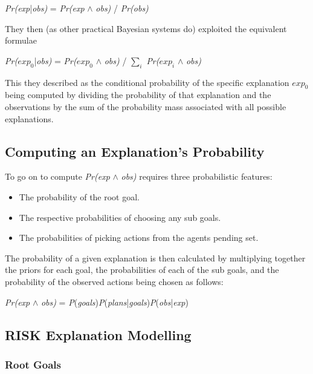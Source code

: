\documentclass[parskip]{cs4rep}
\begin{document}
\centerline{
\textit{Pr(exp}|\textit{obs)} = \textit{Pr(exp} $\wedge$ \textit{obs)} / \textit{Pr(obs)}
}

They then (as other practical Bayesian systems do) exploited the equivalent formulae\newline

\centerline{
\textit{Pr($exp_0$}|\textit{obs)} = \textit{Pr($exp_0$} $\wedge$ \textit{obs)} / $\displaystyle\sum\nolimits_{i}$ \textit{Pr($exp_i$} $\wedge$ \textit{obs)}
}

This they described as the conditional probability of the specific explanation $exp_0$ being computed by dividing the probability of that explanation and the observations by the sum of the probability mass associated with all possible explanations.

\subsection{Computing an Explanation's Probability}

To go on to compute \textit{Pr(exp} $\wedge$ \textit{obs)} requires three probabilistic features:\newline

\begin{itemize}
\item
The probability of the root goal.
\item
The respective probabilities of choosing any sub goals.
\item
The probabilities of picking actions from the agents pending set.\newline
\end{itemize}

The probability of a given explanation is then calculated by multiplying together the priors for each goal, the probabilities of each of the sub goals, and the probability of the observed actions being chosen as follows:\newline

\centerline{
\textit{Pr(exp} $\wedge$ \textit{obs)} = \textit{P}(\textit{goals})\textit{P}(\textit{plans}|\textit{goals})\textit{P}(\textit{obs}|\textit{exp})
}

\subsection{RISK Explanation Modelling}

\subsubsection{Root Goals}
\end{document}
